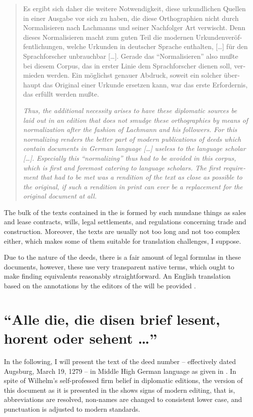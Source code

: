 \documentclass[12pt,paper=a4]{scrartcl}
\begin{document}
\foreignblockquote{german}{\begin{multicols}{2}Es ergibt sich daher die weitere 
Notwendigkeit, diese urkundlichen Quellen in einer Ausgabe vor sich zu haben, 
die diese Orthographien nicht durch Normalisieren nach Lachmanns und seiner 
Nachfolger Art verwischt. Denn dieses Normalisieren macht zum guten Teil die 
modernen Urkundenveröffentlichungen, welche Urkunden in deutscher Sprache 
ent\-halten, […] für den Sprachforscher un\-brauch\-bar […]. Gerade das 
\enquote{Normalisieren} also mußte bei diesem Corpus, das in erster Linie dem 
Sprachforscher dienen soll, vermieden werden. Ein möglichst genauer Abdruck, 
soweit ein solcher überhaupt das Original einer Urkunde ersetzen kann, war das 
erste Erfordernis, das erfüllt werden mußte. \autocite[LX]{CAO1}

\columnbreak

{\itshape Thus, the additional necessity arises to have these diplomatic sources 
be laid out in an edition that does not smudge these orthographies by means of 
normalization after the fashion of Lachmann and his followers. For this 
normalizing renders the better part of modern publications of deeds which 
contain documents in German language […] useless to the language scholar […]. 
Especially this \enquote{normalizing} thus had to be avoided in this corpus, 
which is first and foremost catering to language scholars. The first requirement 
that had to be met was a rendition of the text as close as possible to the 
original, if such a rendition in print can ever be a replacement for the 
original document at all.}\end{multicols}}

The bulk of the texts contained in the  is formed by such mundane 
things as sales and lease contracts, wills, legal settlements, and regulations 
concerning trade and construction. Moreover, the texts are usually not too long 
and not too complex either, which makes some of them suitable for translation 
challenges, I suppose.

Due to the nature of the deeds, there is a fair amount of legal formulas in 
these documents, however, these use very transparent native terms, which ought 
to make finding equivalents reasonably straightforward. An English translation 
based on the annotations by the editors of the  will be provided 
\autocite[see][]{n163-online}.

\section{\enquote{Alle die, die disen brief lesent, horent oder sehent …}}
In the following, I will present the text of the deed number 
 -- effectively dated Augsburg, March 19, 1279 -- in 
Middle High German language as given in \textcites{n163}{n163-online}. In spite 
of Wilhelm's self-professed firm belief in diplomatic editions, the version of 
this document as it is presented in the  shows signs of modern 
editing, that is, abbreviations are resolved, non-names are changed to 
consistent lower case, and punctuation is adjusted to modern standards.
\end{document}
